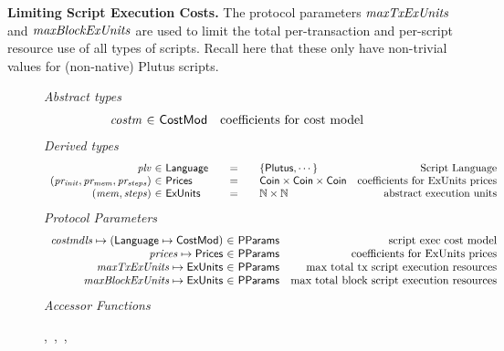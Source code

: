 \textbf{Limiting Script Execution Costs.}
The protocol parameters $\mathit{maxTxExUnits}$ and $\mathit{maxBlockExUnits}$ are
used to limit the total per-transaction and per-script resource use of all
types of scripts. Recall here that these only have non-trivial values for
(non-native) Plutus scripts.

\begin{figure*}[htb]
  \emph{Abstract types}
  \begin{equation*}
    \begin{array}{r@{~\in~}lr}
      \var{costm} & \CostMod & \text{coefficients for cost model} \\
    \end{array}
  \end{equation*}
  \emph{Derived types}
  \begin{equation*}
    \begin{array}{r@{~\in~}l@{\qquad=\qquad}lr}
      \var{plv}
      & \Language
      & \{\Plutus, \dotsb\}
      & \text{Script Language}
      \\
      \var{(pr_{init}, pr_{mem}, pr_{steps})}
      & \Prices
      & \Coin \times \Coin \times \Coin
      & \text {coefficients for ExUnits prices}
      \\
      \var{(mem, steps)}
      & \ExUnits
      & \N \times \N
      & \text{abstract execution units} \\
    \end{array}
  \end{equation*}
  \emph{Protocol Parameters}
  \begin{equation*}
      \begin{array}{r@{~\in~}lr}
        \var{costmdls} \mapsto (\Language \mapsto \CostMod) & \PParams & \text{script exec cost model}\\
        \var{prices} \mapsto \Prices & \PParams & \text{coefficients for ExUnits prices} \\
        \var{maxTxExUnits} \mapsto \ExUnits & \PParams & \text{max total tx script execution resources}\\
        \var{maxBlockExUnits} \mapsto \ExUnits & \PParams & \text{max total block script execution resources}\\
      \end{array}
  \end{equation*}
  \emph{Accessor Functions}
  \begin{center}
  ,~,~,~
  \end{center}

\end{figure*}
